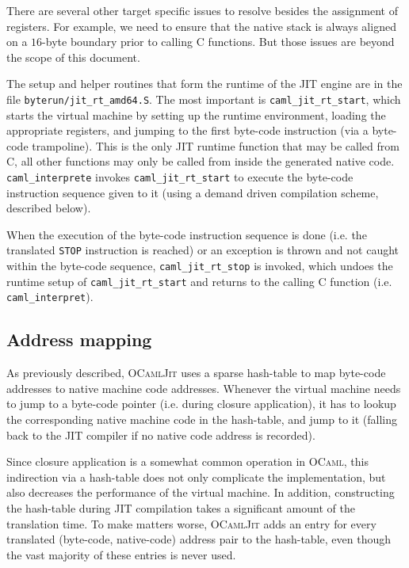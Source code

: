 \documentclass[a4paper]{acm_proc_article-sp}
\begin{document}
There are several other target specific issues to resolve besides the assignment of registers. For example,
we need to ensure that the native stack is always aligned on a $16$-byte boundary prior to calling C functions.
But those issues are beyond the scope of this document.

The setup and helper routines that form the runtime of the JIT engine are in the file
\texttt{byterun/jit\_rt\_amd64.S}. The most important is \texttt{caml\_jit\_rt\_start}, which
starts the virtual machine by setting up the runtime environment, loading the appropriate registers,
and jumping to the first byte-code instruction (via a byte-code trampoline). This is the only
JIT runtime function that may be called from C, all other functions may only be
called from inside the generated native code. \texttt{caml\_interprete} invokes \texttt{caml\_jit\_rt\_start}
to execute the byte-code instruction sequence given to it (using a demand driven compilation
scheme, described below).

When the execution of the byte-code instruction sequence is done (i.e. the translated \texttt{STOP}
instruction is reached) or an exception is thrown and not caught within the byte-code sequence,
\texttt{caml\_jit\_rt\_stop} is invoked, which undoes the runtime setup of \texttt{caml\_jit\_rt\_start}
and returns to the calling C function (i.e. \texttt{caml\_interpret}).

\subsection{Address mapping} \label{subsection:Address_mapping}

As previously described, \textsc{OCamlJit} uses a sparse hash-table to map byte-code addresses to
native machine code addresses.
Whenever the virtual machine needs to jump to a byte-code pointer (i.e. during closure application),
it has to lookup the corresponding native machine code in the hash-table, and jump to it (falling back
to the JIT compiler if no native code address is recorded).

Since closure application is a somewhat common operation in \textsc{OCaml}, this indirection via a
hash-table does not only complicate the implementation, but also decreases the performance of the
virtual machine. In addition, constructing the hash-table during JIT compilation takes a significant
amount of the translation time. To make matters worse, \textsc{OCamlJit} adds an entry for every
translated (byte-code, native-code) address pair to the hash-table, even though the vast majority
of these entries is never used.
\end{document}
